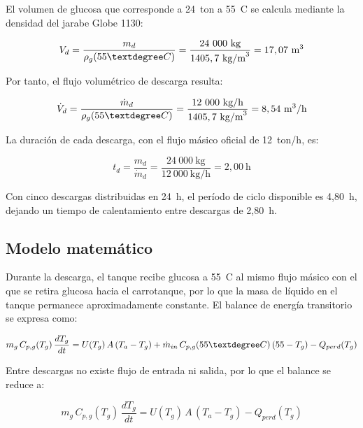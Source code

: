 El volumen de glucosa que corresponde a 24~ton a 55~\textdegree C se calcula mediante la densidad del jarabe Globe 1130:

\begin{equation}
V_d = \frac{m_d}{\rho_g(55\textdegree C)} = \frac{24~000~\text{kg}}{1405,7~\text{kg/m}^3} = 17,07~\text{m}^3
\label{eq:volumen_descarga_oficial}
\end{equation}

Por tanto, el flujo volumétrico de descarga resulta:

\begin{equation}
\dot{V}_d = \frac{\dot{m}_d}{\rho_g(55\textdegree C)} = \frac{12~000~\text{kg/h}}{1405,7~\text{kg/m}^3} = 8,54~\text{m}^3/\text{h}
\label{eq:flujo_volumetrico_oficial}
\end{equation}

La duración de cada descarga, con el flujo másico oficial de 12~ton/h, es:

\begin{equation}
t_d = \frac{m_d}{\dot{m}_d} = \frac{24~000~\text{kg}}{12~000~\text{kg/h}} = 2,00~\text{h}
\label{eq:duracion_descarga_oficial}
\end{equation}

Con cinco descargas distribuidas en 24~h, el período de ciclo disponible es 4,80~h, dejando un tiempo de calentamiento entre descargas de 2,80~h.

\subsection{Modelo matemático}

Durante la descarga, el tanque recibe glucosa a 55~\textdegree C al mismo flujo másico con el que se retira glucosa hacia el carrotanque, por lo que la masa de líquido en el tanque permanece aproximadamente constante. El balance de energía transitorio se expresa como:

\begin{equation}
m_g \, C_{p,g}(T_g) \, \frac{dT_g}{dt} = U(T_g) \, A \, (T_a - T_g) + \dot{m}_{in} \, C_{p,g}(55\textdegree C) \, (55 - T_g) - Q_{perd}(T_g)
\label{eq:balance_descarga_oficial}
\end{equation}

Entre descargas no existe flujo de entrada ni salida, por lo que el balance se reduce a:

\begin{equation}
m_g \, C_{p,g}(T_g) \, \frac{dT_g}{dt} = U(T_g) \, A \, (T_a - T_g) - Q_{perd}(T_g)
\label{eq:balance_calentamiento_oficial}
\end{equation}

